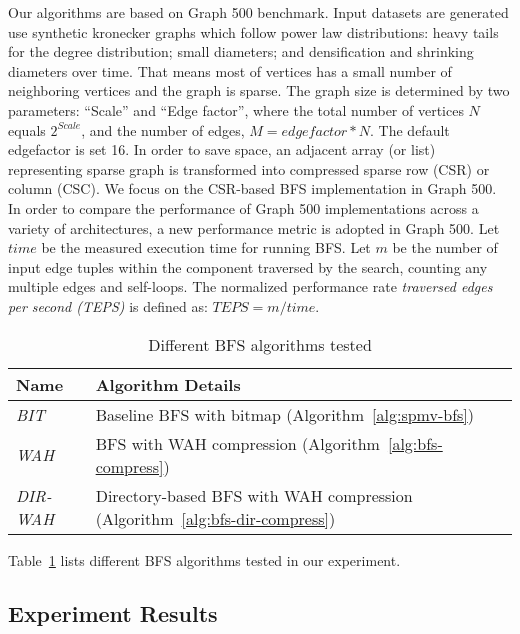 \documentclass[conference]{IEEEtran}
\begin{document}
Our algorithms are based on Graph 500 benchmark. Input datasets are generated
use synthetic kronecker graphs \cite{kronecker-graph} which follow power law
distributions: heavy tails for the degree distribution; small diameters; and
densification and shrinking diameters over time. That means most of vertices
has a small number of neighboring vertices and the graph is sparse.  The graph
size is determined by two parameters: ``Scale'' and ``Edge factor'', where the
total number of vertices $N$ equals $2^{Scale}$, and the number of edges, $M =
edgefactor * N$. The default edgefactor is set 16. In order to save space, an
adjacent array (or list) representing sparse graph is transformed into
compressed sparse row (CSR) or column (CSC). We focus on the CSR-based BFS
implementation in Graph 500. In order to compare the performance of Graph 500
implementations across a variety of architectures, a new performance metric is
adopted in Graph 500. Let $time$ be the measured execution time for running
BFS. Let $m$ be the number of input edge tuples within the component traversed
by the search, counting any multiple edges and self-loops. The normalized
performance rate \textit{traversed edges per second (TEPS)} is defined as:
$TEPS = m / time$.

\begin{table}[t]
  \caption{Different BFS algorithms tested}
  \label{table:diff-bfs-tested}
  \begin{center}
    \begin{tabularx}{0.48\textwidth}{ll}
      \toprule Name & Algorithm Details\\\midrule
      \textit{BIT} & Baseline BFS with bitmap (Algorithm~\ref{alg:spmv-bfs}) \\
      \textit{WAH} & BFS with WAH compression (Algorithm~\ref{alg:bfs-compress})\\
      \textit{DIR-WAH} & Directory-based BFS with WAH compression (Algorithm~\ref{alg:bfs-dir-compress})\\
\bottomrule
    \end{tabularx}
  \end{center}
\end{table}
Table~\ref{table:diff-bfs-tested} lists different BFS algorithms tested in our
experiment.

\subsection{Experiment Results}
\label{sec:exp-res}
\end{document}
